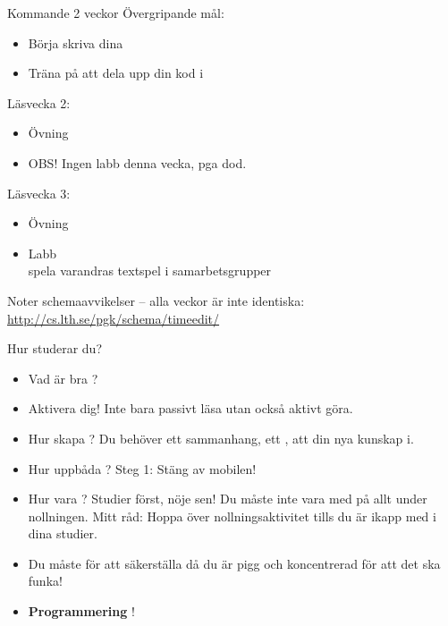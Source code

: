 \begin{SlideExtra}{Kommande 2 veckor}
Övergripande mål:
\begin{itemize}
\item Börja skriva dina 
\item Träna på att dela upp din kod i 
\end{itemize}

Läsvecka 2:
\begin{itemize}
\item Övning \texttt{\ExeWeekTWO}
\item OBS! Ingen labb denna vecka, pga dod.
\end{itemize}
Läsvecka 3:
\begin{itemize}
\item Övning \texttt{\ExeWeekTHREE}
\item Labb \texttt{\LabWeekTHREE}  \\ spela varandras textspel i samarbetsgrupper
\end{itemize}

\vspace{1em} Noter schemaavvikelser -- alla veckor är inte identiska:\\\url{http://cs.lth.se/pgk/schema/timeedit/}

\end{SlideExtra}




\begin{SlideExtra}{Hur studerar du?}
\begin{itemize}
\item Vad är bra ?
\item Aktivera dig! Inte bara passivt läsa utan också aktivt göra.
\item Hur skapa ?
Du behöver ett sammanhang, ett , att  din nya kunskap i.
\item Hur uppbåda ? Steg 1: Stäng av mobilen!
\item Hur vara ? Studier först, nöje sen! Du måste inte vara med på allt under nollningen. Mitt råd: Hoppa över nollningsaktivitet tills du är ikapp med i dina studier.
\item Du måste  för att säkerställa  då du är pigg och koncentrerad för att det ska funka!
\item \textbf{Programmering}  !
\end{itemize}
\end{SlideExtra}


